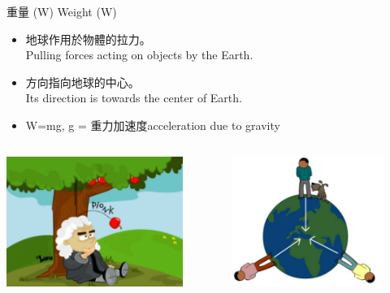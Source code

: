 \documentclass[beamer=true]{standalone}
\begin{document}
\begin{frame}{重量 (W) Weight (W)}
    \begin{itemize}
        \item 地球作用於物體的拉力。\\Pulling forces acting on objects by the Earth.
        \item 方向指向地球的中心。\\ Its direction is towards the center of Earth.
        \item W=mg, g = 重力加速度acceleration due to gravity
    \end{itemize}
    \begin{columns}
        \centering
        \includegraphics[width=\textwidth]{assets/47712628.png}
        \begin{figure}[h!]
            \centering
            \includegraphics[width=\textwidth]{assets/97f12fb9.png}
        \end{figure}
    \end{columns}


\end{frame}
\end{document}
